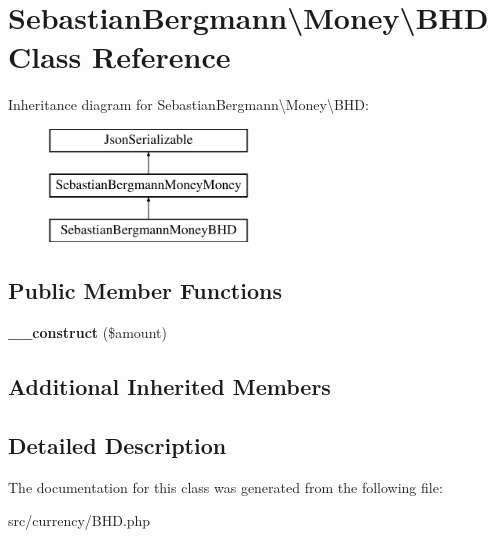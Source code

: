 \hypertarget{classSebastianBergmann_1_1Money_1_1BHD}{}\section{Sebastian\+Bergmann\textbackslash{}Money\textbackslash{}B\+H\+D Class Reference}
\label{classSebastianBergmann_1_1Money_1_1BHD}
Inheritance diagram for Sebastian\+Bergmann\textbackslash{}Money\textbackslash{}B\+H\+D\+:\begin{figure}[H]
\begin{center}
\leavevmode
\includegraphics[height=3.000000cm]{classSebastianBergmann_1_1Money_1_1BHD}
\end{center}
\end{figure}
\subsection*{Public Member Functions}
\begin{DoxyCompactItemize}
\item 
\hypertarget{classSebastianBergmann_1_1Money_1_1BHD_a4adeff5df6924065059bd2c9b223d9e2}{}{\bfseries \+\_\+\+\_\+construct} (\$amount)\label{classSebastianBergmann_1_1Money_1_1BHD_a4adeff5df6924065059bd2c9b223d9e2}

\end{DoxyCompactItemize}
\subsection*{Additional Inherited Members}


\subsection{Detailed Description}


The documentation for this class was generated from the following file\+:\begin{DoxyCompactItemize}
\item 
src/currency/B\+H\+D.\+php\end{DoxyCompactItemize}
